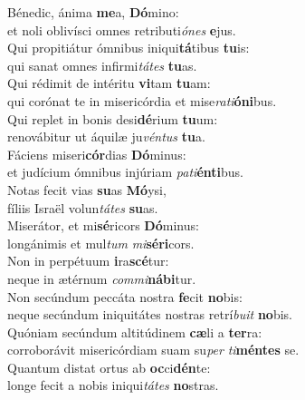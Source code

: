 \evenverse Bénedic, ánima \textbf{me}a, \textbf{Dó}mino:~\*\\
\evenverse et noli oblivísci omnes retributi\textit{ó}\textit{nes} \textbf{e}jus.\\
\oddverse Qui propitiátur ómnibus iniqui\textbf{tá}tibus \textbf{tu}is:~\*\\
\oddverse qui sanat omnes infirmi\textit{tá}\textit{tes} \textbf{tu}as.\\
\evenverse Qui rédimit de intéritu \textbf{vi}tam \textbf{tu}am:~\*\\
\evenverse qui corónat te in misericórdia et mise\textit{ra}\textit{ti}\textbf{ó}\textbf{ni}bus.\\
\oddverse Qui replet in bonis desi\textbf{dé}rium \textbf{tu}um:~\*\\
\oddverse renovábitur ut áquilæ ju\textit{vén}\textit{tus} \textbf{tu}a.\\
\evenverse Fáciens miseri\textbf{cór}dias \textbf{Dó}minus:~\*\\
\evenverse et judícium ómnibus injúriam \textit{pa}\textit{ti}\textbf{én}\textbf{ti}bus.\\
\oddverse Notas fecit vias \textbf{su}as \textbf{Mó}ysi,~\*\\
\oddverse fíliis Israël volun\textit{tá}\textit{tes} \textbf{su}as.\\
\evenverse Miserátor, et mi\textbf{sé}ricors \textbf{Dó}minus:~\*\\
\evenverse longánimis et mul\textit{tum} \textit{mi}\textbf{sé}\textbf{ri}cors.\\
\oddverse Non in perpétuum \textbf{i}ra\textbf{scé}tur:~\*\\
\oddverse neque in ætérnum \textit{com}\textit{mi}\textbf{ná}\textbf{bi}tur.\\
\evenverse Non secúndum peccáta nostra \textbf{fe}cit \textbf{no}bis:~\*\\
\evenverse neque secúndum iniquitátes nostras retrí\textit{bu}\textit{it} \textbf{no}bis.\\
\oddverse Quóniam secúndum altitúdinem \textbf{cæ}li a \textbf{ter}ra:~\*\\
\oddverse corroborávit misericórdiam suam su\textit{per} \textit{ti}\textbf{mén}\textbf{tes} se.\\
\evenverse Quantum distat ortus ab \textbf{oc}ci\textbf{dén}te:~\*\\
\evenverse longe fecit a nobis iniqui\textit{tá}\textit{tes} \textbf{no}stras.\\
